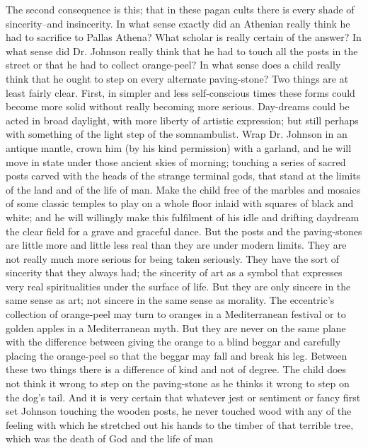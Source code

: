 The second consequence is this; that in these pagan cults there is every shade of sincerity--and insincerity. In what sense exactly did an Athenian really think he had to sacrifice to Pallas Athena? What scholar is really certain of the answer? In what sense did Dr. Johnson really think that he had to touch all the posts in the street or that he had to collect orange-peel? In what sense does a child really think that he ought to step on every alternate paving-stone? Two things are at least fairly clear. First, in simpler and less self-conscious times these forms could become more solid without really becoming more serious. Day-dreams could be acted in broad daylight, with more liberty of artistic expression; but still perhaps with something of the light step of the somnambulist. Wrap Dr. Johnson in an antique mantle, crown him (by his kind permission) with a garland, and he will move in state under those ancient skies of morning; touching a series of sacred posts carved with the heads of the strange terminal gods, that stand at the limits of the land and of the life of man. Make the child free of the marbles and mosaics of some classic temples to play on a whole floor inlaid with squares of black and white; and he will willingly make this fulfilment of his idle and drifting daydream the clear field for a grave and graceful dance. But the posts and the paving-stones are little more and little less real than they are under modern limits. They are not really much more serious for being taken seriously. They have the sort of sincerity that they always had; the sincerity of art as a symbol that expresses very real spiritualities under the surface of life. But they are only sincere in the same sense as art; not sincere in the same sense as morality. The eccentric's collection of orange-peel may turn to oranges in a Mediterranean festival or to golden apples in a Mediterranean myth. But they are never on the same plane with the difference between giving the orange to a blind beggar and carefully placing the orange-peel so that the beggar may fall and break his leg. Between these two things there is a difference of kind and not of degree. The child does not think it wrong to step on the paving-stone as he thinks it wrong to step on the dog's tail. And it is very certain that whatever jest or sentiment or fancy first set Johnson touching the wooden posts, he never touched wood with any of the feeling with which he stretched out his hands to the timber of that terrible tree, which was the death of God and the life of man

